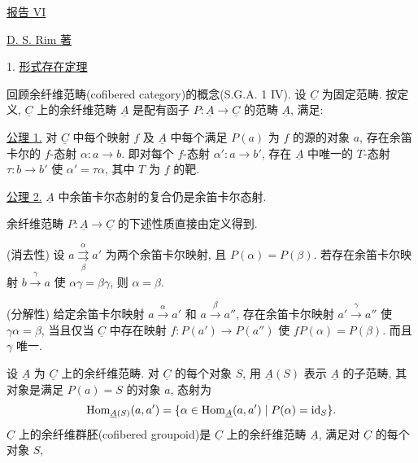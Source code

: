 
\begin{center}
\underline{报告 VI}

\vspace{1em}

\vspace{1em}
\underline{D. S. Rim 著}
\end{center}

1. \underline{形式存在定理}

回顾余纤维范畴(cofibered category)的概念(S.G.A. 1 IV). 设
$\underline C$ 为固定范畴. 按定义, $\underline C$ 上的余纤维范畴
$\underline A$ 是配有函子 $P:\underline A\longrightarrow\underline C$
的范畴 $\underline A$, 满足:

\underline{公理 1.} 对 $\underline C$ 中每个映射 $f$ 及 $\underline A$
中每个满足 $P(a)$ 为 $f$ 的源的对象 $a$, 存在余笛卡尔的 $f$-态射
$\alpha:a\longrightarrow b$. 即对每个 $f$-态射 $\alpha':a\longrightarrow b'$,
存在 $\underline A$ 中唯一的 $T$-态射 $\tau:b\longrightarrow b'$
使 $\alpha'=\tau\alpha$, 其中 $T$ 为 $f$ 的靶.

\underline{公理 2.} $\underline A$ 中余笛卡尔态射的复合仍是余笛卡尔态射.

余纤维范畴 $P:\underline A\longrightarrow\underline C$ 的下述性质直接由定义得到.

(消去性) 设 $a\overset{\alpha}{\underset{\beta}{\rightrightarrows}}a'$
为两个余笛卡尔映射, 且 $P(\alpha)=P(\beta)$. 若存在余笛卡尔映射
$b\xrightarrow{\gamma}a$ 使 $\alpha\gamma=\beta\gamma$, 则 $\alpha=\beta$.

(分解性) 给定余笛卡尔映射 $a\xrightarrow{\alpha}a'$ 和
$a\xrightarrow{\beta}a''$, 存在余笛卡尔映射 $a'\xrightarrow{\gamma}a''$
使 $\gamma\alpha=\beta$, 当且仅当 $\underline C$ 中存在映射
$f:P(a')\longrightarrow P(a'')$ 使 $fP(\alpha)=P(\beta)$.
而且 $\gamma$ 唯一.

设 $\underline A$ 为 $\underline C$ 上的余纤维范畴. 对 $\underline C$
的每个对象 $S$, 用 $\underline A(S)$ 表示 $\underline A$ 的子范畴,
其对象是满足 $P(a)=S$ 的对象 $a$, 态射为
\[
 \Hom_{\underline A(S)}(a,a')=
 \{\alpha\in\Hom_{\underline A}(a,a')\mid P(\alpha)=\id_S\}.
\]
$\underline C$ 上的余纤维群胚(cofibered groupoid)是 $\underline C$
上的余纤维范畴 $\underline A$, 满足对 $\underline C$ 的每个对象 $S$,

